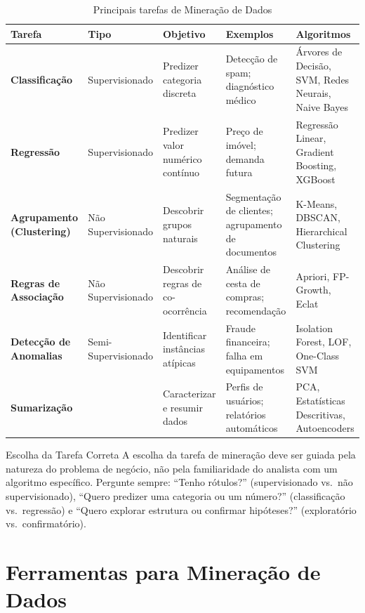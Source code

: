 \documentclass[12pt,a4paper]{article}
\begin{document}
\begin{table}[ht]
\centering
\caption{Principais tarefas de Mineração de Dados}
\label{tab:tarefas}
\footnotesize
\begin{tabular}{>{\bfseries}p{2.4cm} p{2.0cm} p{2.5cm} p{2.5cm} p{3.5cm}}
\toprule
\textbf{Tarefa} & \textbf{Tipo} & \textbf{Objetivo} & \textbf{Exemplos} & \textbf{Algoritmos} \\
\midrule
Classificação & Supervisionado & Predizer categoria discreta & Detecção de spam; diagnóstico médico & Árvores de Decisão, SVM, Redes Neurais, Naive Bayes \\
\midrule
Regressão & Supervisionado & Predizer valor numérico contínuo & Preço de imóvel; demanda futura & Regressão Linear, Gradient Boosting, XGBoost \\
\midrule
Agrupamento (Clustering) & Não Supervisionado & Descobrir grupos naturais & Segmentação de clientes; agrupamento de documentos & K-Means, DBSCAN, Hierarchical Clustering \\
\midrule
Regras de Associação & Não Supervisionado & Descobrir regras de co-ocorrência & Análise de cesta de compras; recomendação & Apriori, FP-Growth, Eclat \\
\midrule
Detecção de Anomalias & Semi-Supervisionado & Identificar instâncias atípicas & Fraude financeira; falha em equipamentos & Isolation Forest, LOF, One-Class SVM \\
\midrule
Sumarização & & Caracterizar e resumir dados & Perfis de usuários; relatórios automáticos & PCA, Estatísticas Descritivas, Autoencoders \\
\bottomrule
\end{tabular}
\end{table}

\begin{dicabox}{Escolha da Tarefa Correta}
A escolha da tarefa de mineração deve ser guiada pela natureza do problema de negócio, não pela familiaridade do analista com um algoritmo específico. Pergunte sempre: ``Tenho rótulos?'' (supervisionado vs.\ não supervisionado), ``Quero predizer uma categoria ou um número?'' (classificação vs.\ regressão) e ``Quero explorar estrutura ou confirmar hipóteses?'' (exploratório vs.\ confirmatório).
\end{dicabox}

\section{Ferramentas para Mineração de Dados}
\end{document}

